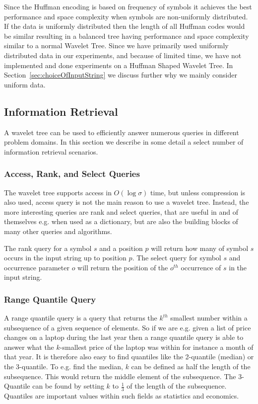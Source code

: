 Since the Huffman encoding is based on frequency of symbols it achieves the best performance and space complexity when symbols are non-uniformly distributed.
If the data is uniformly distributed then the length of all Huffman codes would be similar resulting in a balanced tree having performance and space complexity similar to a normal Wavelet Tree.
Since we have primarily used uniformly distributed data in our experiments, and because of limited time, we have not implemented and done experiments on a Huffman Shaped Wavelet Tree.
In Section~\ref{sec:choiceOfInputString} we discuss further why we mainly consider uniform data.


\subsection{Information Retrieval}
A wavelet tree can be used to efficiently answer numerous queries in different problem domains.
In this section we describe in some detail a select number of information retrieval scenarios.

\subsubsection{Access, Rank, and Select Queries}
The wavelet tree supports access in $O(\log \sigma)$ time, but unless compression is also used, access query is not the main reason to use a wavelet tree.
Instead, the more interesting queries are rank and select queries, that are useful in and of themselves e.g. when used as a dictionary, but are also the building blocks of many other queries and algorithms.

The rank query for a symbol $s$ and a position $p$ will return how many of symbol $s$ occurs in the input string up to position $p$.
The select query for symbol $s$ and occurrence parameter $o$ will return the position of the $o^{th}$ occurrence of $s$ in the input string.



\subsubsection{Range Quantile Query}
A range quantile query is a query that returns the $k^{th}$ smallest number within a subsequence of a given sequence of elements.
So if we are e.g. given a list of price changes on a laptop during the last year then a range quantile query is able to answer what the $k$-smallest price of the laptop was within for instance a month of that year.
It is therefore also easy to find quantiles like the 2-quantile (median) or the 3-quantile.
To e.g. find the median, $k$ can be defined as half the length of the subsequence.
This would return the middle element of the subsequence.
The 3-Quantile can be found by setting $k$ to $\frac{1}{3}$ of the length of the subsequence. 
Quantiles are important values within such fields as statistics and economics.

